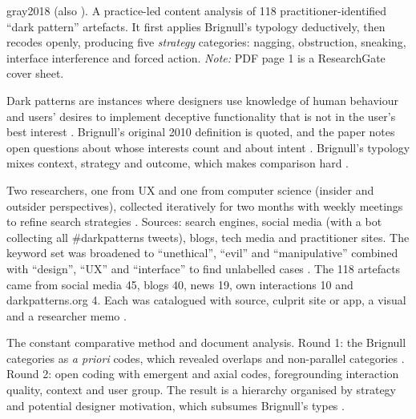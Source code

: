 \begin{papercard}{gray2018}
   (also ). A practice-led content analysis of 118 practitioner-identified ``dark pattern'' artefacts. It first applies Brignull's typology deductively, then recodes openly, producing five \emph{strategy} categories: nagging, obstruction, sneaking, interface interference and forced action. \emph{Note:} PDF page 1 is a ResearchGate cover sheet.

 Dark patterns are instances where designers use knowledge of human behaviour and users' desires to implement deceptive functionality that is not in the user's best interest . Brignull's original 2010 definition is quoted, and the paper notes open questions about whose interests count and about intent . Brignull's typology mixes context, strategy and outcome, which makes comparison hard .

 Two researchers, one from UX and one from computer science (insider and outsider perspectives), collected iteratively for two months with weekly meetings to refine search strategies . Sources: search engines, social media (with a bot collecting all \#darkpatterns tweets), blogs, tech media and practitioner sites. The keyword set was broadened to ``unethical'', ``evil'' and ``manipulative'' combined with ``design'', ``UX'' and ``interface'' to find unlabelled cases . The 118 artefacts came from social media 45, blogs 40, news 19, own interactions 10 and darkpatterns.org 4. Each was catalogued with source, culprit site or app, a visual and a researcher memo .

 The constant comparative method and document analysis. Round 1: the Brignull categories as \emph{a priori} codes, which revealed overlaps and non-parallel categories . Round 2: open coding with emergent and axial codes, foregrounding interaction quality, context and user group. The result is a hierarchy organised by strategy and potential designer motivation, which subsumes Brignull's types .


\end{papercard}
